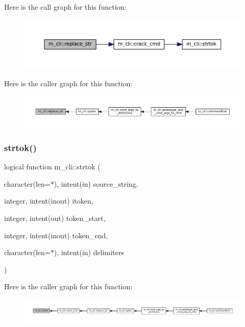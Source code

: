 Here is the call graph for this function\+:\nopagebreak
\begin{figure}[H]
\begin{center}
\leavevmode
\includegraphics[width=350pt]{namespacem__cli_a40e02b1c9fc580ddd410bb24017fab8c_cgraph}
\end{center}
\end{figure}
Here is the caller graph for this function\+:\nopagebreak
\begin{figure}[H]
\begin{center}
\leavevmode
\includegraphics[width=350pt]{namespacem__cli_a40e02b1c9fc580ddd410bb24017fab8c_icgraph}
\end{center}
\end{figure}
\mbox{\label{namespacem__cli_a0015c38f9fa45a58ba6ae89f2ddb54f1}} 
\subsubsection{\texorpdfstring{strtok()}{strtok()}}
{\footnotesize\ttfamily logical function m\+\_\+cli\+::strtok (\begin{DoxyParamCaption}\item[{character(len=$\ast$), intent(in)}]{source\+\_\+string,  }\item[{integer, intent(inout)}]{itoken,  }\item[{integer, intent(out)}]{token\+\_\+start,  }\item[{integer, intent(inout)}]{token\+\_\+end,  }\item[{character(len=$\ast$), intent(in)}]{delimiters }\end{DoxyParamCaption})\hspace{0.3cm}{\ttfamily [private]}}

Here is the caller graph for this function\+:\nopagebreak
\begin{figure}[H]
\begin{center}
\leavevmode
\includegraphics[width=350pt]{namespacem__cli_a0015c38f9fa45a58ba6ae89f2ddb54f1_icgraph}
\end{center}
\end{figure}
\mbox{\label{namespacem__cli_a3b66fe9cee0e084068051636afb2957d}} 
